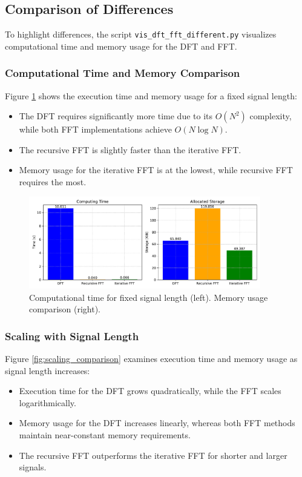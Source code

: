 \documentclass[12pt, a4paper]{report}
\begin{document}
\subsection{Comparison of Differences}
To highlight differences, the script \texttt{vis\_dft\_fft\_different.py} visualizes computational time and memory usage for the \ac{DFT} and \ac{FFT}.

\subsubsection{Computational Time and Memory Comparison}
Figure \ref{fig:time_memory_comparison} shows the execution time and memory usage for a fixed signal length:
\begin{itemize}
	\item The \ac{DFT} requires significantly more time due to its \(O(N^2)\) complexity, while both \ac{FFT} implementations achieve \(O(N \log N)\).
	\item The recursive \ac{FFT} is slightly faster than the iterative \ac{FFT}.
	\item Memory usage for the iterative \ac{FFT} is at the lowest, while recursive \ac{FFT} requires the most.
\end{itemize}

\begin{figure}[h!]
	\centering
	\includegraphics[width=0.9\textwidth]{figures/dft_fftr_ffti.pdf}
	\caption{Computational time for fixed signal length (left). Memory usage comparison (right).}
	\label{fig:time_memory_comparison}
\end{figure}

\subsubsection{Scaling with Signal Length}
Figure \ref{fig:scaling_comparison} examines execution time and memory usage as signal length increases:
\begin{itemize}
	\item Execution time for the \ac{DFT} grows quadratically, while the \ac{FFT} scales logarithmically.
	\item Memory usage for the \ac{DFT} increases linearly, whereas both \ac{FFT} methods maintain near-constant memory requirements.
	\item The recursive \ac{FFT} outperforms the iterative \ac{FFT} for shorter and larger signals.
\end{itemize}
\end{document}
